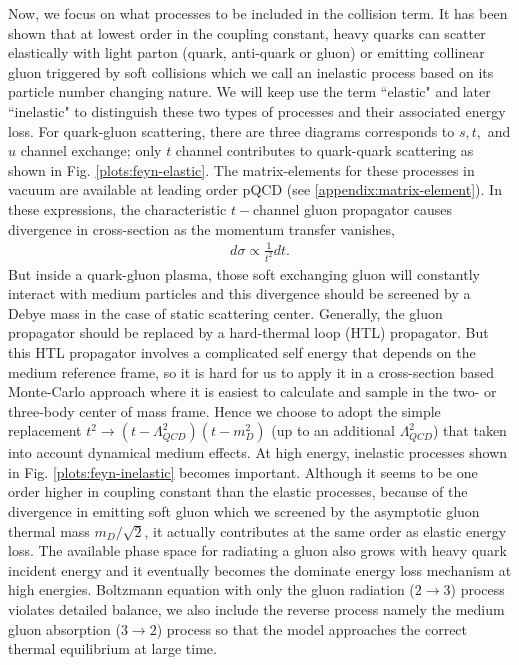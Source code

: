 \documentclass[aps, prc, reprint, amsmath, groupedaddress, nofootinbib]{revtex4-1}
\begin{document}
Now, we focus on what processes to be included in the collision term.
It has been shown that at lowest order in the coupling constant, heavy quarks can scatter elastically with light parton (quark, anti-quark or gluon) or emitting collinear gluon triggered by soft collisions which we call an inelastic process based on its particle number changing nature.
We will keep use the term ``elastic" and later ``inelastic" to distinguish these two types of processes and their associated energy loss.
For quark-gluon scattering, there are three diagrams corresponds to $s, t,$ and $u$ channel exchange; only $t$ channel contributes to quark-quark scattering as shown in Fig. \ref{plots:feyn-elastic}.
The matrix-elements for these processes in vacuum are available at leading order pQCD (see \ref{appendix:matrix-element}).
In these expressions, the characteristic $t-$channel gluon propagator causes divergence in cross-section as the momentum transfer vanishes,
\begin{eqnarray}
d\sigma \propto \frac{1}{t^2} dt.
\end{eqnarray}
But inside a quark-gluon plasma, those soft exchanging gluon will constantly interact with medium particles and this divergence should be  screened by a Debye mass in the case of static scattering center.
Generally, the gluon propagator should be replaced by a hard-thermal loop (HTL) propagator.
But this HTL propagator involves a complicated self energy that depends on the medium reference frame, so it is hard for us to apply it in a cross-section based Monte-Carlo approach where it is easiest to calculate and sample in the two- or three-body center of mass frame.
Hence we choose to adopt the simple replacement $t^2 \rightarrow (t-\Lambda_{QCD}^2)(t - m_D^2)$ (up to an additional $\Lambda_{QCD}^2$) that taken into account dynamical medium effects.
At high energy, inelastic processes shown in Fig. \ref{plots:feyn-inelastic} becomes important.
Although it seems to be one order higher in coupling constant than the elastic processes, because of the divergence in emitting soft gluon which we screened by the asymptotic gluon thermal mass $m_D/\sqrt{2}$, it actually contributes at the same order as elastic energy loss.
The available phase space for radiating a gluon also grows with heavy quark incident energy and it eventually becomes the dominate energy loss mechanism at high energies.
Boltzmann equation with only the gluon radiation ($2\rightarrow 3$) process violates detailed balance, we also include the reverse process namely the medium gluon absorption ($3\rightarrow 2$) process so that the model approaches the correct thermal equilibrium at large time.
\end{document}
